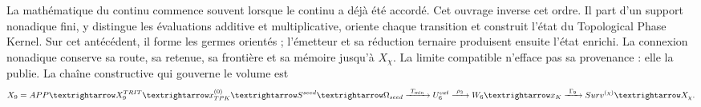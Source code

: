 La mathématique du continu commence souvent lorsque le continu a déjà été
accordé. Cet ouvrage inverse cet ordre. Il part d'un support nonadique fini,
y distingue les évaluations additive et multiplicative, oriente chaque
transition et construit l'état du Topological Phase Kernel. Sur cet
antécédent, il forme les germes orientés ; l'émetteur et sa réduction ternaire
produisent ensuite l'état enrichi. La connexion nonadique conserve sa
route, sa retenue, sa frontière et sa mémoire jusqu'à \(X_\chi\). La limite
compatible n'efface pas sa provenance : elle la publie. La chaîne constructive qui
gouverne le volume est
\begin{equation}\label{eq:front-cadena-causal-completa}
 X_9=\mathrm{APP}\longrightarrow X_9^{\rm TRIT}
 \longrightarrow x_{\rm TPK}^{(0)}
 \longrightarrow S^{\rm seed}
 \longrightarrow \Omega_{\rm seed}
 \xrightarrow{\ T_{\min}\ }U_6^{\rm cat}
 \xrightarrow{\ \rho_3\ }W_6
 \longrightarrow \widehat x_K
 \xrightarrow{\ \Gamma_9\ }
 \operatorname{Surv}^{(\chi)}
 \longrightarrow X_\chi .
\end{equation}
